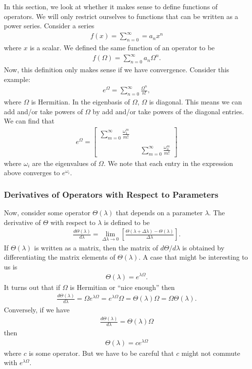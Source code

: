 \documentclass{book}
\theoremstyle{definition}
\newcommand{\f}[2]{\frac{#1}{#2}}
\newcommand{\lb}{\left[}
\newcommand{\rb}{\right]}
\begin{document}
In this section, we look at whether it makes sense to define functions of operators. We will only restrict ourselves to functions that can be written as a power series. Consider a series
\begin{align}
f(x) = \sum_{n=0}^\infty = a_n x^n
\end{align}
where $x$ is a scalar. We defined the same function of an operator to be
\begin{align}
f(\Omega) = \sum_{n=0}^\infty a_n\Omega^n.
\end{align}
Now, this definition only makes sense if we have convergence. Consider this example:
\begin{align}
e^\Omega = \sum^\infty_{n=0}\f{\Omega^n}{n!},
\end{align}
where $\Omega$ is Hermitian. In the eigenbasis of $\Omega$, $\Omega$ is diagonal. This means we can add and/or take powers of $\Omega$ by add and/or take powers of the diagonal entries. We can find that
\begin{align}
e^\Omega = \begin{bmatrix}
\sum^\infty_{m=0}\f{\omega^m_1}{m!}&&\\
&&\\
&&\sum^\infty_{m=0}\f{\omega^m_n}{m!}
\end{bmatrix}
\end{align}
where $\omega_i$ are the eigenvalues of $\Omega$. We note that each entry in the expression above converges to $e^{\omega_i}$.



\subsubsection{Derivatives of Operators with Respect to Parameters}
Now, consider some operator $\Theta(\lambda)$ that depends on a parameter $\lambda$. The derivative of $\Theta$ with respect to $\lambda$ is defined to be
\begin{align}
\f{d\Theta(\lambda)}{d\lambda} = \lim_{\Delta\lambda \to 0} \lb \f{\Theta(\lambda + \Delta \lambda) - \Theta(\lambda)}{\Delta \lambda} \rb.
\end{align}
If $\Theta(\lambda)$ is written as a matrix, then the matrix of $d\Theta/d\lambda$ is obtained by differentiating the matrix elements of $\Theta(\lambda)$. A case that might be interesting to us is 
\begin{align}
\Theta(\lambda) = e^{\lambda\Omega}.
\end{align}
It turns out that if $\Omega$ is Hermitian or ``nice enough'' then 
\begin{align}
\f{d\Theta(\lambda)}{d\lambda} = \Omega e^{\lambda\Omega} = e^{\lambda\Omega}\Omega = \Theta(\lambda)\Omega = \Omega \Theta(\lambda).
\end{align}
Conversely, if we have
\begin{align}
\f{d\Theta(\lambda)}{d\lambda} = \Theta(\lambda)\Omega
\end{align}
then 
\begin{align}
\Theta(\lambda) = ce^{\lambda\Omega}
\end{align}
where $c$ is some operator. But we have to be careful that $c$ might not commute with $e^{\lambda\Omega}$.
\end{document}
